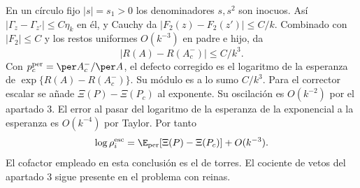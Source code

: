 En un círculo fijo $|s|=s_1>0$ los denominadores $s,s^2$ son inocuos.
Así $|\Gamma_z-\Gamma_{z'}|\le C\eta_k$ en él, y Cauchy da
$|F_2(z)-F_2(z')|\le C/k$. Combinado con $|F_2|\le C$ y los restos
uniformes $O(k^{-3})$ en padre e hijo, da
\[
 |R(A)-R(A^-_c)|\le C/k^3 .
\]
Con $p_c^{\rm per}=\per A^-_c/\per A$, el defecto corregido es el logaritmo
de la esperanza de $\exp\{R(A)-R(A^-_c)\}$. Su módulo es a lo sumo $C/k^3$.
Para el corrector escalar se añade $\Xi(P)-\Xi(P_c)$ al exponente. Su oscilación
es $O(k^{-2})$ por el apartado 3. El error al pasar del logaritmo de la esperanza
de la exponencial a la esperanza es $O(k^{-4})$ por Taylor. Por tanto
\[
 \log\rho^{\rm esc}_i=\E_{\rm per}[\Xi(P)-\Xi(P_c)]+O(k^{-3}).
\]
El cofactor empleado en esta conclusión es el de torres. El cociente de vetos
del apartado 3 sigue presente en el problema con reinas.
